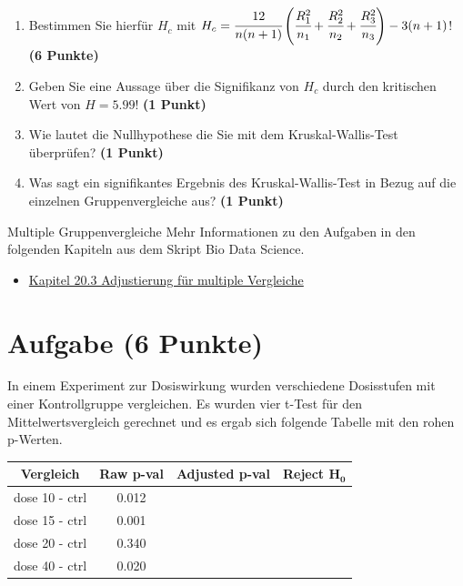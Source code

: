 \documentclass[a4paper, 10pt]{scrartcl}\usepackage[]{graphicx}\usepackage[]{xcolor}
\begin{document}
\begin{enumerate}
\item Bestimmen Sie hierf{\"u}r $H_c$ mit $H_c =
  \cfrac{12}{n(n+1)}\left(\cfrac{R_1^2}{n_1}+\cfrac{R_2^2}{n_2}
    + \cfrac{R_3^2}{n_3}\right)
  - 3(n+1)$! \textbf{(6 Punkte)} 
\item Geben Sie eine Aussage {\"u}ber die Signifikanz von $H_c$ durch
  den kritischen Wert von $H = 5.99$! \textbf{(1 Punkt)}
\item Wie lautet die Nullhypothese die Sie mit dem Kruskal-Wallis-Test
  {\"u}berpr{\"u}fen? \textbf{(1 Punkt)}
\item Was sagt ein signifikantes Ergebnis des Kruskal-Wallis-Test in Bezug
  auf die einzelnen Gruppenvergleiche aus? \textbf{(1 Punkt)}
\end{enumerate} 
\clearpage
\begin{graybox}{Multiple Gruppenvergleiche}
Mehr Informationen zu den Aufgaben in den folgenden Kapiteln aus dem Skript Bio Data Science.
  \begin{itemize}
  \item \href{https://jkruppa.github.io/stat-tests-theorie.html#sec-statistisches-testen-alpha-adjust}{Kapitel 20.3 Adjustierung für multiple Vergleiche}
  \end{itemize}
\end{graybox}

\section{Aufgabe \hfill (6 Punkte)}

In einem Experiment zur Dosiswirkung wurden verschiedene Dosisstufen mit
einer Kontrollgruppe vergleichen. Es wurden vier t-Test f{\"u}r den
Mittelwertsvergleich gerechnet und es ergab sich folgende Tabelle mit den
rohen p-Werten.



\begin{center}
  \Large
  \begin{tabular}{c|c|c|c}
    \textbf{Vergleich} & \textbf{Raw p-val} & \textbf{Adjusted p-val} &
                                                                        \textbf{Reject $\boldsymbol{H_0}$} \strut\\
    \hline
    dose 10 - ctrl  & 0.012 &  &\strut\\
    \hline
    dose 15 - ctrl  & 0.001 & &\strut\\
    \hline
    dose 20 - ctrl  & 0.340 & &\strut\\
    \hline
    dose 40 - ctrl  & 0.020 & &\strut\\
  \end{tabular}
\end{center}
\end{document}

